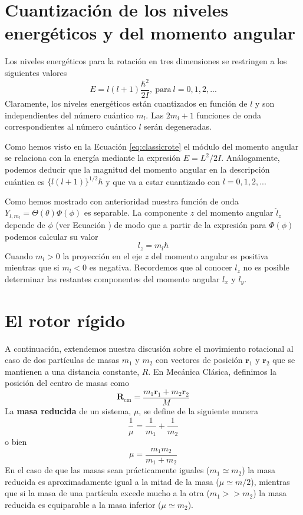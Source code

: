 \section{Cuantización de los niveles energéticos y
del momento angular}
Los niveles energéticos para la rotación en tres 
dimensiones se restringen a los siguientes valores
\begin{equation}
    E=l(l+1)\frac{\hbar^2}{2I}, 
    \mathrm{~ para~}l=0,1,2,...
\end{equation}
Claramente, los niveles energéticos están cuantizados 
en función de $l$ y son independientes del número 
cuántico $m_l$. Las $2m_l+1$ funciones de onda
correspondientes al número cuántico $l$ serán 
degeneradas.

Como hemos visto en la Ecuación \ref{eq:classicrote} el 
módulo del momento angular se relaciona con la energía
mediante la expresión $E=L^2/2I$. Análogamente, podemos
deducir que la magnitud del momento angular en la 
descripción cuántica es $\{l(l+1)\}^{1/2}\hbar$ y que va
a estar cuantizado con $l=0,1,2,...$

Como hemos mostrado con anterioridad nuestra
función de onda $Y_{l,m_l}=\Theta(\theta)\Phi(\phi)$
es separable. La componente $z$ del momento angular
$\hat{l}_z$ depende de $\phi$ (ver Ecuación \label{eq:lz})
de modo que a partir de la expresión para $\Phi(\phi)$
podemos calcular su valor
\begin{equation}
    l_z=m_l\hbar
\end{equation}
Cuando $m_l>0$ la proyección en el eje $z$ del momento
angular  es positiva mientras que si $m_l<0$  es negativa.
Recordemos que al conocer $l_z$ no es posible determinar 
las restantes componentes del momento angular $l_x$ y $l_y$.

\section{El rotor rígido}
A continuación, extendemos nuestra discusión sobre el 
movimiento rotacional al caso de dos partículas de masas 
$m_1$ y $m_2$ con vectores de posición $\mathbf{r}_1$ y 
$\mathbf{r}_2$ que se mantienen a una distancia constante,
$R$. En Mecánica Clásica, definimos la posición del centro
de masas como 
\begin{equation}
    \mathbf{R}_\mathrm{cm}= \frac{m_1\mathbf{r}_1+m_2\mathbf{r}_2}{M}
\end{equation}
La \textbf{masa reducida} de un sistema, $\mu$, se define
de la siguiente manera
\begin{equation}
    \frac{1}{\mu}=\frac{1}{m_1}+\frac{1}{m_2}
\end{equation}
o bien
\begin{equation}
    \mu=\frac{m_1m_2}{m_1+m_2}
\end{equation}
En el caso de que las masas sean prácticamente iguales 
($m_1\simeq m_2$) la masa reducida es aproximadamente 
igual a la mitad de la masa ($\mu\simeq m/2$), mientras
que si la masa de una partícula excede mucho a la otra
($m_1>>m_2$) la masa reducida es equiparable
a la masa inferior ($\mu\simeq m_2$).

